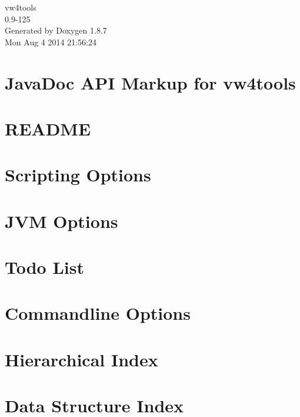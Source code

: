 \documentclass[twoside]{book}
\newcommand{\+}{\discretionary{\mbox{\scriptsize$\hookleftarrow$}}{}{}}
\newcommand{\clearemptydoublepage}{%
  \newpage{\pagestyle{empty}\cleardoublepage}%
}
\begin{document}
\begin{titlepage}
\vspace*{7cm}
\begin{center}%
{\Large vw4tools \\[1ex]\large 0.\+9-\/125 }\\
\vspace*{1cm}
{\large Generated by Doxygen 1.8.7}\\
\vspace*{0.5cm}
{\small Mon Aug 4 2014 21:56:24}\\
\end{center}
\end{titlepage}
\clearemptydoublepage
\tableofcontents
\clearemptydoublepage
{}

\chapter{Java\+Doc A\+P\+I Markup for vw4tools}
\label{index}
\chapter{R\+E\+A\+D\+M\+E}
\label{md_htdocs_README}

\chapter{Scripting Options}
\label{scripts}

\chapter{J\+V\+M Options}
\label{jvmopt}

\chapter{Todo List}
\label{todo}

\chapter{Commandline Options}
\label{cmdopt}

\chapter{Hierarchical Index}

\chapter{Data Structure Index}

\end{document}
